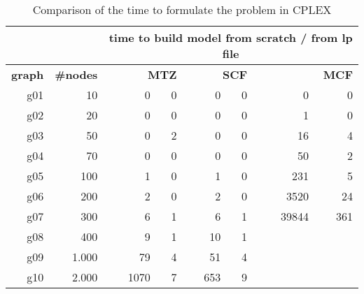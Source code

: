 \documentclass{article}
\begin{document}
	\begin{table}[htbp]
		\centering
		\caption{Comparison of the time to formulate the problem in CPLEX}
		\begin{tabular}{rr|rr|rr|rr}
			&       & \multicolumn{6}{c}{time to build model from scratch / from lp file} \\
			\midrule
			\multicolumn{1}{p{3.5em}}{\textbf{graph}} & \multicolumn{1}{p{3.5em}|}{\textbf{\#nodes}} & \multicolumn{2}{p{9em}|}{\textbf{MTZ}} & \multicolumn{2}{p{9em}|}{\textbf{SCF}} & \multicolumn{2}{p{9em}}{\textbf{MCF}} \\
			\midrule
			g01   & 10    & 0     & 0     & 0     & 0     & 0     & 0 \\
			g02   & 20    & 0     & 0     & 0     & 0     & 1     & 0 \\
			g03   & 50    & 0     & 2     & 0     & 0     & 16    & 4 \\
			g04   & 70    & 0     & 0     & 0     & 0     & 50    & 2 \\
			g05   & 100   & 1     & 0     & 1     & 0     & 231   & 5 \\
			g06   & 200   & 2     & 0     & 2     & 0     & 3520  & 24 \\
			g07   & 300   & 6     & 1     & 6     & 1     & 39844 & 361 \\
			g08   & 400   & 9     & 1     & 10    & 1     &       &  \\
			g09   & 1.000 & 79    & 4     & 51    & 4     &       &  \\
			g10   & 2.000 & 1070  & 7     & 653   & 9     &       &  \\
		\end{tabular}%
		\label{tab:build_time}%
	\end{table}%

	
	
\end{document}
